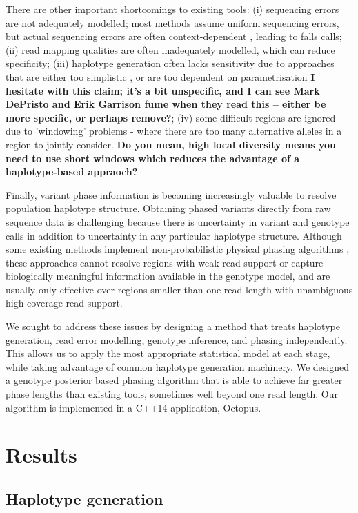 \documentclass[notitlepage, twocolumn]{article}
\begin{document}
There are other important shortcomings to existing tools: (i) sequencing errors are not adequately modelled; most methods \cite{freebayes, gatk} assume uniform sequencing errors, but actual sequencing errors are often context-dependent \cite{illumina-error}, leading to falls calls; (ii) read mapping qualities \cite{maq} are often inadequately modelled, which can reduce specificity; (iii) haplotype generation often lacks sensitivity due to approaches that are either too simplistic \cite{freebayes}, or are too dependent on parametrisation \cite{gatk} {\bf I hesitate with this claim; it's a bit unspecific, and I can see Mark DePristo and Erik Garrison fume when they read this -- either be more specific, or perhaps remove?}; (iv) some difficult regions are ignored due to 'windowing' problems - where there are too many alternative alleles in a region to jointly consider. {\bf Do you mean, high local diversity means you need to use short windows which reduces the advantage of a haplotype-based appraoch?}

Finally, variant phase information is becoming increasingly valuable to resolve population haplotype structure. Obtaining phased variants directly from raw sequence data is challenging because there is uncertainty in variant and genotype calls in addition to uncertainty in any particular haplotype structure. Although some existing methods implement non-probabilistic physical phasing algorithms \cite{freebayes}, these approaches cannot resolve regions with weak read support or capture biologically meaningful information available in the genotype model, and are usually only effective over regions smaller than one read length with unambiguous high-coverage read support.

We sought to address these issues by designing a method that treats haplotype generation, read error modelling, genotype inference, and phasing independently. This allows us to apply the most appropriate statistical model at each stage, while taking advantage of common haplotype generation machinery. We designed a genotype posterior based phasing algorithm that is able to achieve far greater phase lengths than existing tools, sometimes well beyond one read length. Our algorithm is implemented in a C++14 application, Octopus.

\section*{Results}

\subsection*{Haplotype generation}
\end{document}
